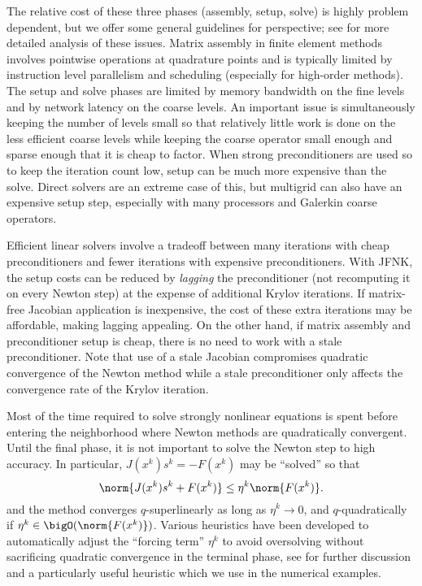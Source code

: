 The relative cost of these three phases (assembly, setup, solve) is highly problem dependent, but we offer some general
guidelines for perspective; see \cite{gropp2000pmt,knoll2004jfn,knoll1998eni} for more detailed analysis of these
issues.  Matrix assembly in finite element methods involves pointwise operations at quadrature points and is typically
limited by instruction level parallelism and scheduling (especially for high-order methods).  The setup and solve phases
are limited by memory bandwidth on the fine levels and by network latency on the coarse levels.  An important issue is
simultaneously keeping the number of levels small so that relatively little work is done on the less efficient coarse
levels while keeping the coarse operator small enough and sparse enough that it is cheap to factor.  When strong
preconditioners are used so to keep the iteration count low, setup can be much more expensive than the solve.  Direct
solvers are an extreme case of this, but multigrid can also have an expensive setup step, especially with many
processors and Galerkin coarse operators.

Efficient linear solvers involve a tradeoff between many iterations with cheap preconditioners and fewer iterations with
expensive preconditioners.  With JFNK, the setup costs can be reduced by \emph{lagging} the preconditioner (not
recomputing it on every Newton step) at the expense of additional Krylov iterations.  If matrix-free Jacobian
application is inexpensive, the cost of these extra iterations may be affordable, making lagging appealing.  On the
other hand, if matrix assembly and preconditioner setup is cheap, there is no need to work with a stale preconditioner.
Note that use of a stale Jacobian compromises quadratic convergence of the Newton method while a stale preconditioner
only affects the convergence rate of the Krylov iteration.

Most of the time required to solve strongly nonlinear equations is spent before entering the neighborhood where Newton
methods are quadratically convergent.  Until the final phase, it is not important to solve the Newton step to high
accuracy.  In particular, $J(x^{k}) s^k = - F(x^k)$ may be ``solved'' so that
\begin{equation*}
  \norm{J(x^{k}) s^k + F(x^k)} \le \eta^k \norm{F(x^k)} .
\end{equation*}
and the method converges $q$-superlinearly as long as $\eta^k \to 0$, and $q$-quadratically if $\eta^k \in
\bigO(\norm{F(x^k)})$.  Various heuristics have been developed to automatically adjust the ``forcing term'' $\eta^k$ to
avoid oversolving without sacrificing quadratic convergence in the terminal phase, see \cite{eisenstat1996cft} for
further discussion and a particularly useful heuristic which we use in the numerical examples.

